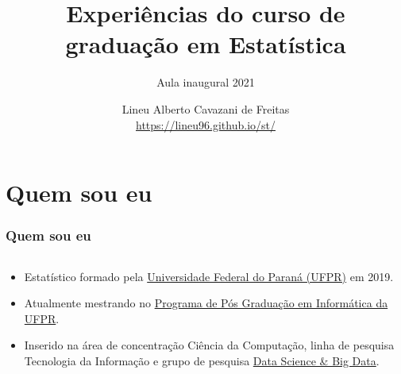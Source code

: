 \documentclass[10pt,
  aspectratio=169,
  serif,
  mathserif,
  professionalfont,
  compress,
  handout,
  ]{beamer}\usepackage[]{graphicx}\usepackage[]{color}
\title[Aula Inaugural]{
  \LARGE Experiências do curso de\\ graduação em Estatística \vspace{0.2cm}}
\subtitle{Aula inaugural 2021}
\author[Lineu Alberto]{%
  Lineu Alberto Cavazani de Freitas \\
  \href{}{https://lineu96.github.io/st/}
}
\institute[UFPR]{}
\date{}
\begin{document}
\frame{
  \titlepage
}






\section{Quem sou eu}

\begin{frame}
\frametitle{Quem sou eu}
\begin{columns}
\begin{column}{0.7\textwidth}
   \begin{itemize}
   \itemsep 2ex

  \item Estatístico formado pela \href{https://www.ufpr.br/portalufpr/}{Universidade Federal do Paraná (UFPR)} em 2019.

  \item Atualmente mestrando no \href{http://www.prppg.ufpr.br/ppginformatica/?lang=pb}{Programa de Pós Graduação em Informática da UFPR}.

  \item Inserido na área de concentração Ciência da Computação, linha de pesquisa Tecnologia da Informação e grupo de pesquisa \href{https://web.inf.ufpr.br/dsbd/}{Data Science \& Big Data}.
  
  \end{itemize}
  

\end{column}
\end{columns}
\end{frame}
\end{document}

